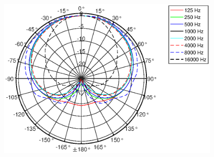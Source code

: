 \begin{figure}[bth]
    \centering
    \includegraphics[width=\linewidth]{Figures/KM184_allfreqs}
    \label{fig:Polar_allfreqs}
\end{figure}


